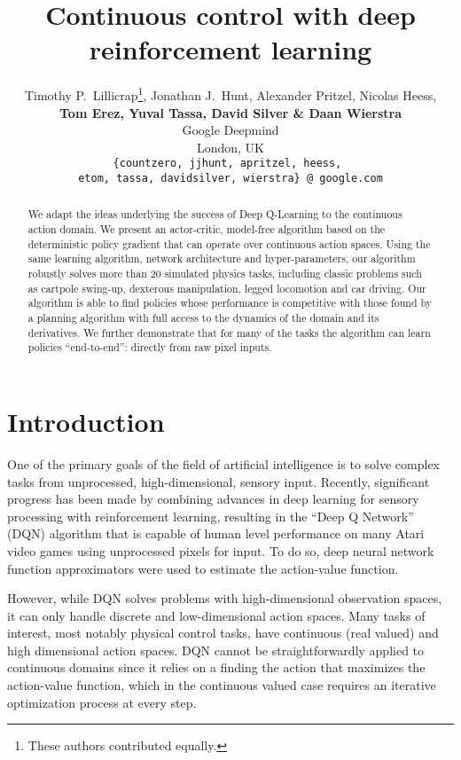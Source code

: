 \documentclass{article} \usepackage{iclr2016_conference,times}
\title{Continuous control with deep reinforcement learning}
\author{
\hspace{-1mm}Timothy P.~Lillicrap\thanks{These authors contributed equally.},
Jonathan J.~Hunt\footnotemark[1],
Alexander Pritzel,
Nicolas Heess,\\
\textbf{Tom Erez,
Yuval Tassa,
David Silver \&
Daan Wierstra}
\\
Google Deepmind \\
London, UK\\
\texttt{\{countzero, jjhunt, apritzel, heess,
  } \\
  \texttt{\phantom{\{}etom, tassa, davidsilver,
  wierstra\} @ google.com}
}
\begin{document}
\maketitle

\begin{abstract}
  We adapt the ideas underlying the success of Deep Q-Learning
  to the
  continuous action domain. We present an actor-critic, model-free
  algorithm based on the deterministic policy gradient that can operate
  over continuous action spaces.  Using the same learning algorithm,
  network architecture and hyper-parameters, our algorithm
  robustly solves more than 20 simulated physics tasks, including classic
  problems such as cartpole swing-up, dexterous manipulation,
  legged locomotion and car driving. Our algorithm is
  able to find policies whose performance is competitive with those
  found by a planning algorithm with full access to the dynamics
  of the domain and its derivatives. We further
  demonstrate that for many of the tasks the algorithm can learn
  policies ``end-to-end'': directly from raw pixel inputs.
\end{abstract}

\section{Introduction}

One of the primary goals of the field of artificial intelligence is to
solve complex tasks from
unprocessed, high-dimensional, sensory input.
Recently, significant progress has been made by combining advances in
deep learning for sensory processing \citep{krizhevsky2012imagenet}
with reinforcement learning,
resulting in the ``Deep Q Network'' (DQN) algorithm \citep{mnih2015human}
that is capable of human level performance on many Atari video games
using unprocessed pixels for input. To do so, deep neural
network function approximators were used to estimate the action-value
function.

However, while DQN solves problems with high-dimensional observation spaces,
it can only handle discrete and low-dimensional action spaces.
Many tasks of interest, most notably physical control tasks, have
continuous (real valued) and high dimensional action spaces.  DQN
cannot be straightforwardly applied
to continuous domains since it relies on a finding the
action that maximizes the action-value function, which in the
continuous valued case requires an iterative optimization process at
every step.
\end{document}
